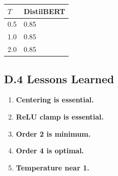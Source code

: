 \begin{table}[H]
\centering
\small
\begin{tabular}{ll}
\toprule
\textbf{$T$} & \textbf{DistilBERT} \\
\midrule
0.5 & 0.85 \\
1.0 & 0.85 \\
2.0 & 0.85 \\
\bottomrule
\end{tabular}
\end{table}

\subsection{D.4 Lessons Learned}

\begin{enumerate}
\item \textbf{Centering is essential.}
\item \textbf{ReLU clamp is essential.}
\item \textbf{Order 2 is minimum.}
\item \textbf{Order 4 is optimal.}
\item \textbf{Temperature near 1.}

\end{enumerate}
